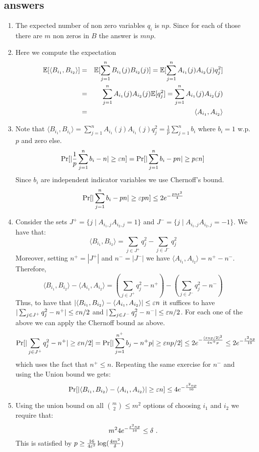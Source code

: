 \documentclass{article}
\begin{document}
\subsection*{answers}
\begin{enumerate}
\item The expected number of non zero variables $q_i$ is $np$. Since for each of those there are $m$ non zeros in $B$ the answer is $mnp$.
\item Here we compute the expectation 
\begin{eqnarray*}
{\mathbb E}[\langle B_{i_1}, B_{i_2} \rangle] &=& {\mathbb E}[\sum_{j=1}^{n} B_{i_1}(j) B_{i_2}(j) ] = {\mathbb E}[\sum_{j=1}^{n} A_{i_1}(j) A_{i_2}(j) q_j^2 ]  \\
&=& \sum_{j=1}^{n} A_{i_1}(j) A_{i_2}(j) {\mathbb E}[q_j^2 ] = \sum_{j=1}^{n} A_{i_1}(j) A_{i_2}(j) \\ 
&=& \langle A_{i_1}, A_{i_2} \rangle 
\end{eqnarray*}
\item Note that $\langle B_{i_1}, B_{i_1} \rangle = \sum_{j=1}^{n} A_{i_1}(j) A_{i_1}(j) q_j^2 = \frac{1}{p}\sum_{j=1}^{n}b_i$ where $b_i = 1$ w.p. $p$ and zero else. 
\[
\Pr[ | \frac{1}{p}\sum_{j=1}^{n}b_i - n | \ge \varepsilon n ] = \Pr[ | \sum_{j=1}^{n}b_i - pn | \ge p\varepsilon n ]
\]
Since $b_i$ are independent indicator variables we use Chernoff's bound.
\[
\Pr[ | \sum_{j=1}^{n}b_i - pn | \ge \varepsilon pn ] \le 2e^{-\frac{pn\varepsilon^2}{4}}
\]
\item Consider the sets $ J^{+} = \{ j \;| \;A_{i_1,j} A_{i_2,j} = 1\}$ and $ J^{-} = \{ j \;| \;A_{i_1,j} A_{i_2,j} = -1\}$. 
We have that:
$$\langle B_{i_1}, B_{i_2} \rangle = \sum_{j \in J^+} q^2_j - \sum_{j \in J^-} q^2_j$$
Moreover, setting $n^{+} = |J^{+}|$ and $n^{-} = |J^{-}|$ we have $\langle A_{i_1}, A_{i_2} \rangle = n^{+}  - n^{-}$.
Therefore, 
$$\langle B_{i_1}, B_{i_2} \rangle - \langle A_{i_1}, A_{i_2} \rangle = (\sum_{j \in J^+} q^2_j - n^{+})  - (\sum_{j \in J^-} q^2_j  - n^{-})$$
Thus, to have that $|\langle B_{i_1}, B_{i_2} \rangle - \langle A_{i_1}, A_{i_2} \rangle| \le \varepsilon n$ it suffices to have 
$|\sum_{j \in J^+} q^2_j - n^{+}| \le \varepsilon n/2$ and $|\sum_{j \in J^-} q^2_j - n^{-}| \le \varepsilon n/2$.
For each one of the above we can apply the Chernoff bound as above.
$$\Pr [|\sum_{j \in J^+} q^2_j - n^{+}| \ge \varepsilon n/2] = \Pr [|\sum_{j=1}^{n^{+}} b_j - n^{+}p | \ge \varepsilon  np/2] \le 2e^{-\frac{(\varepsilon  np/2)^2}{4n^{+}p}} \le 2e^{-\frac{\varepsilon^2np}{16}}$$
which uses the fact that $n^{+} \le n$.
Repeating the same exercise for $n^-$ and using the Union bound we gets: 
\[
\Pr[ | \langle B_{i_1}, B_{i_2} \rangle - \langle A_{i_1}, A_{i_2} \rangle | \ge \varepsilon n ] \le 4 e^{-\frac{\varepsilon^2np}{16}}
\]

\item Using the union bound on all ${m \choose 2} \le m^2$ options of choosing $i_1$ and $i_2$ we require that: 
$$ m^2   4 e^{-\frac{\varepsilon^2np}{16}} \le \delta \ . $$
This is satisfied by $p \ge \frac{16}{4\varepsilon^2}\log(\frac{4m^2}{\delta})$
\end{enumerate}
\pagebreak
\end{document}
